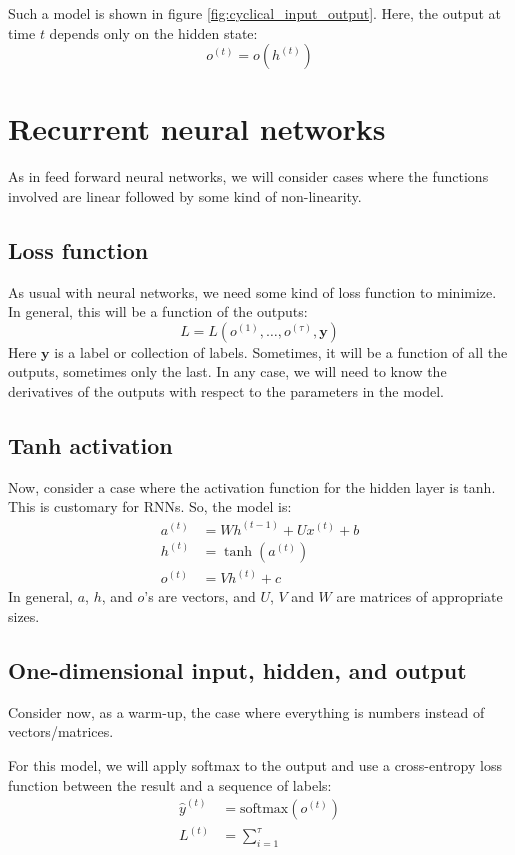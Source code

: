 \documentclass[12pt, a4paper]{article}
\numberwithin{equation}{section}
\begin{document}
Such a model is shown in figure \ref{fig:cyclical_input_output}. Here, the output at time $t$ depends only on the hidden state:
\begin{equation}
o^{(t)}=o(h^{(t)})
\end{equation}

\section{Recurrent neural networks}
As in feed forward neural networks, we will consider cases where the functions involved are linear followed by some kind of non-linearity.

\subsection{Loss function}
As usual with neural networks, we need some kind of loss function to minimize. In general, this will be a function of the outputs:
\begin{equation}
L=L(o^{(1)},\ldots,o^{(\tau)},\mathbf{y})
\end{equation}
Here $\mathbf{y}$ is a label or collection of labels. Sometimes, it will be a function of all the outputs, sometimes only the last. In any case, we will need to know the derivatives of the outputs with respect to the parameters in the model.

\subsection{Tanh activation}
Now, consider a case where the activation function for the hidden layer is tanh. This is customary for RNNs. So, the model is:
\begin{align}
a^{(t)}&=W h^{(t-1)}+U x^{(t)}+b\\
h^{(t)}&=\tanh(a^{(t)})\\
o^{(t)}&=V h^{(t)}+c
\end{align}
In general, $a$, $h$, and $o$'s are vectors, and $U$, $V$ and $W$ are matrices of appropriate sizes.

\subsection{One-dimensional input, hidden, and output}
Consider now, as a warm-up, the case where everything is numbers instead of vectors/matrices.

For this model, we will apply softmax to the output and use a cross-entropy loss function between the result and a sequence of labels:
\begin{align}
\hat{y}^{(t)}&=\textrm{softmax}(o^{(t)})\\
L^{(t)}&=\sum_{i=1}^\tau
\end{align}
\end{document}
